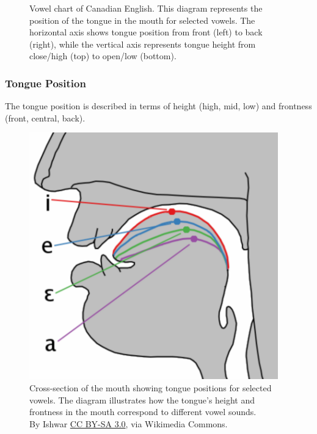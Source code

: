 \begin{figure}
\begin{center}
\end{center}




    \caption{Vowel chart of Canadian English. This diagram represents the position of the tongue in the mouth for selected vowels. The horizontal axis shows tongue position from front (left) to back (right), while the vertical axis represents tongue height from close/high (top) to open/low (bottom).}
    \label{fig:Toronto-vowels}
\end{figure}

\subsubsection{Tongue Position}

The tongue position is described in terms of height (high, mid, low) and frontness (front, central, back).

\begin{figure}
    \centering
    \includegraphics[width=0.25\linewidth]{figures/Cardinal_vowel_tongue_position-front.png}
    \caption{Cross-section of the mouth showing tongue positions for selected vowels. The diagram illustrates how the tongue's height and frontness in the mouth correspond to different vowel sounds. \\\hfill By Ishwar \href{http://creativecommons.org/licenses/by-sa/3.0/}{CC BY-SA 3.0}, via Wikimedia Commons.}
    \label{fig:cardinal-vowels}
\end{figure}


